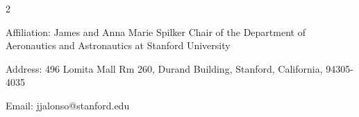 \newpage
{}



\begin{multicols}{2}
\vspace{10pt}
\begin{cvitems}
\paragraphstyle
\item Affiliation: James and Anna Marie Spilker Chair of the Department of Aeronautics and Astronautics at Stanford University
\item Address: 496 Lomita Mall Rm 260, Durand Building, Stanford, California, 94305-4035
\item Email: jjalonso@stanford.edu
\end{cvitems}
\vspace{10pt}






\end{multicols}
